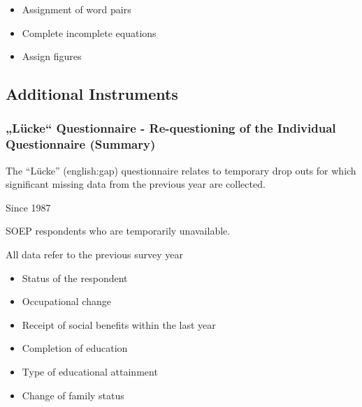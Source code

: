 \documentclass[letterpaper,10pt,openany,onesideH,english]{sphinxmanual}
\begin{document}
\begin{itemize}
\item {} 
Assignment of word pairs

\item {} 
Complete incomplete equations

\item {} 
Assign figures

\end{itemize}


\subsection{Additional Instruments}
\label{\detokenize{Contents of SOEPcore/index:additional-instruments}}

\subsubsection{„Lücke“ Questionnaire - Re-questioning of the Individual Questionnaire (Summary)}
\label{\detokenize{Contents of SOEPcore/index:lucke-questionnaire-re-questioning-of-the-individual-questionnaire-summary}}
The “Lücke” (english:gap) questionnaire relates to temporary drop outs for which significant missing data from the previous year are collected.

 Since 1987

 SOEP respondents who are temporarily unavailable.


All data refer to the previous survey year
\begin{itemize}
\item {} 
Status of the respondent

\item {} 
Occupational change

\item {} 
Receipt of social benefits within the last year

\item {} 
Completion of education

\item {} 
Type of educational attainment

\item {} 
Change of family status

\end{itemize}
\end{document}
